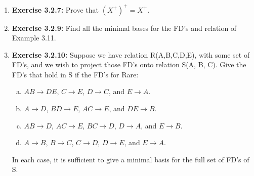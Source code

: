 \documentclass[12pt]{article}
\begin{document}
\begin{enumerate}[1.]
    \item \textbf{Exercise 3.2.7:} Prove that $(X^+)^+ = X^+$.

    \item \textbf{Exercise 3.2.9:} Find all the minimal bases for the FD's and relation of
    Example 3.11.

    \item \textbf{Exercise 3.2.10:} Suppose we have relation R(A,B,C,D,E), with some set
    of FD's, and we wish to project those FD's onto relation S(A, B, C). Give the
    FD's that hold in S if the FD's for Rare:

    \begin{enumerate}[a)]
        \item $AB \to DE$, $C \to E$, $D \to C$, and $E \to A$.
        \item $A \to D$, $BD \to E$, $AC \to E$, and $DE \to B$.
        \item $AB \to D$, $AC \to E$, $BC \to D$, $D \to A$, and $E \to B$.
        \item $A \to B$, $B \to C$, $C \to D$, $D \to E$, and $E \to A$.
    \end{enumerate}

    In each case, it is sufficient to give a minimal basis for the full set of FD's of S.



\end{enumerate}
\end{document}

